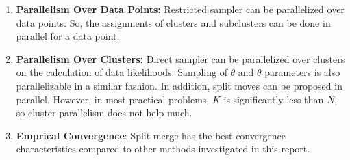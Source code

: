 \documentclass[12pt, a4paper]{article}
\begin{document}
\begin{enumerate}
   \item  \textbf{Parallelism Over Data Points:} Restricted sampler can be parallelized over data points. So, the assignments of clusters and subclusters can be done in parallel for a data point.
   \item  \textbf{Parallelism Over Clusters:} Direct sampler can be parallelized over clusters on the calculation of data likelihoods. Sampling of $\theta$ and $\bar{\theta}$ parameters is also parallelizable in a similar fashion. In addition,  split moves can be proposed in parallel. However, in most practical problems, $K$ is significantly less than $N$, so cluster parallelism does not help much.
   \item  \textbf{Emprical Convergence}:
    Split merge has the best convergence characteristics compared to other methods investigated in this report.
\end{enumerate}
\end{document}
